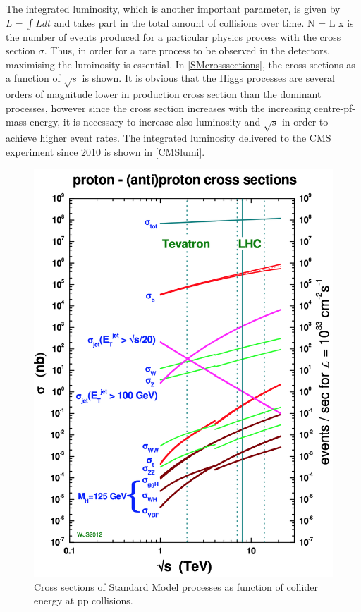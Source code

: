 The integrated luminosity, which is another important parameter, is given by $L = \int L dt$ and takes part in the total amount of collisions over time.
\be
N = L x \sigma
\ee
is the number of events produced for a particular physics process with the cross section $\sigma$. Thus, in order for a rare process to be observed in the detectors, maximising the luminosity is essential. In \autoref{SMcrosssections}, the cross sections as a function of $\sqrt{s}$ is shown. It is obvious that the Higgs processes are several orders of magnitude lower in production cross section than the dominant processes, however since the cross section increases with the increasing centre-pf-mass energy, it is necessary to increase also luminosity and $\sqrt{s}$ in order to achieve higher event rates. The integrated luminosity delivered to the CMS experiment since 2010 is shown in \autoref{CMSlumi}.
\begin{figure}[ht]
	\centering
	\includegraphics[scale=0.5]{MSc_Thesis/fig/stirling.png}
	\vspace{2mm}
	\caption[Cross sections of Standard Model processes as function of collider energy at pp collisions.]
	{Cross sections of Standard Model processes as function of collider energy at pp collisions\cite{stirling}.}
	\label{SMcrosssections}
\end{figure}

